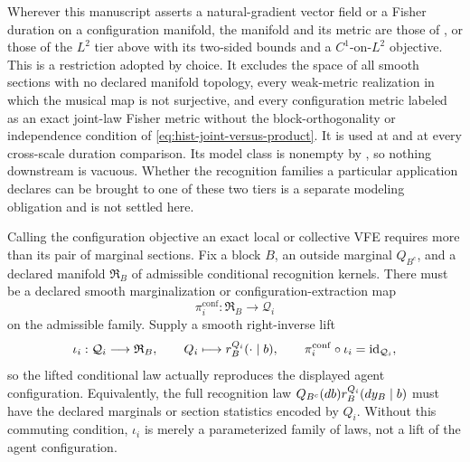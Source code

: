 Wherever this manuscript asserts a natural-gradient vector field or a Fisher
duration on a configuration manifold, the manifold and its metric are those of
, or those of the $L^2$ tier above with
its two-sided bounds and a $C^1$-on-$L^2$ objective.  This is a restriction
adopted by choice.  It excludes the space of all smooth sections with no
declared manifold topology, every weak-metric realization in which the musical
map is not surjective, and every configuration metric labeled as an exact
joint-law Fisher metric without the block-orthogonality or independence
condition of \eqref{eq:hist-joint-versus-product}.  It is used at
and at every cross-scale duration comparison.  Its model class is nonempty by
, so nothing downstream is vacuous.
Whether the recognition families a particular application declares can be
brought to one of these two tiers is a separate modeling obligation and is not
settled here.  

Calling the configuration objective an exact local or collective VFE requires
more than its pair of marginal sections.  Fix a block $B$, an outside marginal
$Q_{B^c}$, and a declared manifold $\mathfrak R_B$ of admissible conditional
recognition kernels.  There must be a declared smooth marginalization or
configuration-extraction map
\begin{equation}
\pi_i^{\mathrm{conf}}:\mathfrak R_B\longrightarrow\mathcal Q_i
\label{eq:hist-configuration-extraction}
\end{equation}
on the admissible family.  Supply a smooth right-inverse lift
\begin{equation}
\iota_i:\mathcal Q_i\longrightarrow\mathfrak R_B,
\qquad
Q_i\longmapsto r_B^{Q_i}(\mathord{\cdot}\mid b),
\qquad
\pi_i^{\mathrm{conf}}\circ\iota_i=\operatorname{id}_{\mathcal Q_i},
\label{eq:hist-exact-vfe-lift}
\end{equation}
so the lifted conditional law actually reproduces the displayed agent
configuration.  Equivalently, the full recognition law
$Q_{B^c}(db)r_B^{Q_i}(dy_B\mid b)$ must have the declared marginals or
section statistics encoded by $Q_i$.  Without this commuting condition,
$\iota_i$ is merely a parameterized family of laws, not a lift of the agent
configuration.

